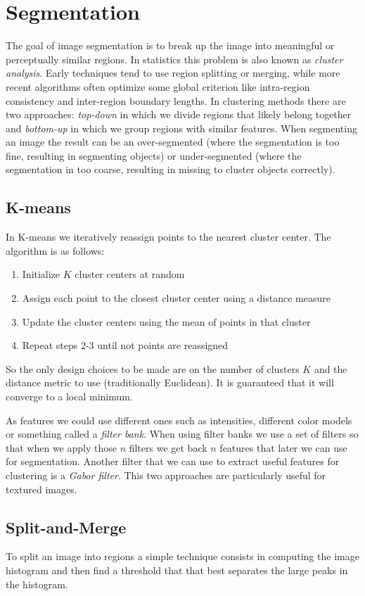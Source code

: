 \documentclass[a4paper,twocolumn]{article}
\begin{document}
\section{Segmentation}
The goal of image segmentation is to break up the image into meaningful or
perceptually similar regions. In statistics this problem is also known as
\textit{cluster analysis}. Early techniques tend to use region splitting or
merging, while more recent algorithms often optimize some global criterion like
intra-region consistency and inter-region boundary lengths. In clustering
methods there are two approaches: \textit{top-down} in which we divide regions
that likely belong together and \textit{bottom-up} in which we group regions
with similar features. When segmenting an image the result can be an
over-segmented (where the segmentation is too fine, resulting in segmenting
objects) or under-segmented (where the segmentation in too coarse, resulting in
missing to cluster objects correctly).

\subsection{K-means}
In K-means we iteratively reassign points to the nearest cluster center. The
algorithm is as follows:
\begin{enumerate}
	\item Initialize $K$ cluster centers at random
	\item Assign each point to the closest cluster center using a distance measure
	\item Update the cluster centers using the mean of points in that cluster
	\item Repeat steps 2-3 until not points are reassigned
\end{enumerate}
So the only design choices to be made are on the number of clusters $K$ and the
distance metric to use (traditionally Euclidean). It is guaranteed that it will
converge to a local minimum.

As features we could use different ones such as intensities, different color
models or something called a \textit{filter bank}. When using filter banks we
use a set of filters so that when we apply those $n$ filters we get back $n$
features that later we can use for segmentation. Another filter that we can use
to extract useful features for clustering is a \textit{Gabor filter}. This two
approaches are particularly useful for textured images.

\subsection{Split-and-Merge}
To split an image into regions a simple technique consists in computing the
image histogram and then find a threshold that that best separates the large
peaks in the histogram.
\end{document}

